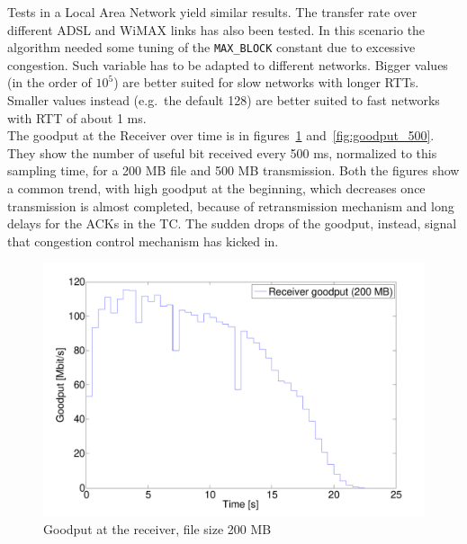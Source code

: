 \documentclass[10pt,twocolumn]{article}
\begin{document}
Tests in a Local Area Network yield similar results. The transfer rate over different ADSL and WiMAX links has also been tested. In
this scenario the algorithm needed some tuning of the \texttt{MAX\_BLOCK}
constant due to excessive congestion. Such variable has to be adapted to
different networks. Bigger values (in the order of $10^5$) are better suited
for slow networks with longer RTTs. Smaller values instead (e.g.\ the default
128) are better suited to fast networks with RTT of about 1 ms. \\
The goodput at the Receiver over time is in figures~\ref{fig:goodput_200} and~\ref{fig:goodput_500}. They show the number of useful bit received every 500 ms, normalized to this sampling time, for a 200 MB file and 500 MB transmission. Both the figures show a common trend, with high goodput at the beginning, which decreases once transmission is almost completed, because of retransmission mechanism and long delays for the ACKs in the TC. The sudden drops of the goodput, instead, signal that congestion control mechanism has kicked in.\\

\begin{figure}[h]
  \centering
  \includegraphics[width = 0.95\columnwidth, keepaspectratio]{tex/images/goodput_c2_200.pdf}
  \caption{Goodput at the receiver, file size 200 MB}
  \label{fig:goodput_200}
\end{figure}
\end{document}
